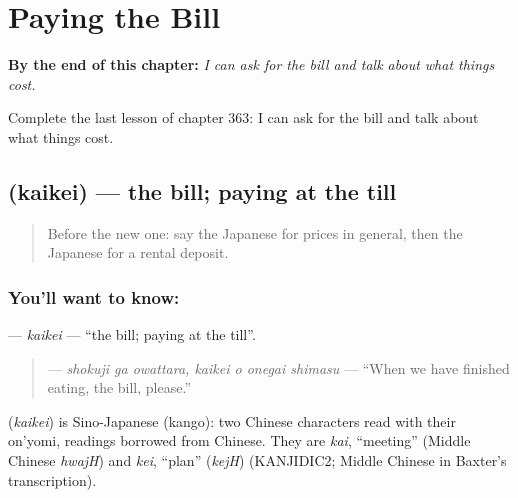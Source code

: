 
\chapter{Paying the Bill}
\label{ch:ja-paying-the-bill}

\begin{chapteropening}
\textbf{By the end of this chapter:} \emph{I can ask for the bill and talk about what things cost.}

Complete the last lesson of chapter 363: I can ask for the bill and talk about what things cost.
\end{chapteropening}

\section[\texorpdfstring{\ja{かいけい} (kaikei)}{かいけい (kaikei)}]{ (kaikei) — the bill; paying at the till}

\label{lesson:JA-C363-kaikei}



\begin{quote}
Before the new one: say the Japanese for prices in general, then the Japanese for a rental deposit.
\end{quote}

\subsection*{You'll want to know: }
\textbf{} — \emph{kaikei} — \textquotedblleft{}the bill; paying at the till\textquotedblright{}.

\begin{quote}
\textbf{  } — \emph{shokuji ga owattara, kaikei o onegai shimasu} — \textquotedblleft{}When we have finished eating, the bill, please.\textquotedblright{}
\end{quote}

\begin{cousinweb}
\textbf{} (\emph{kaikei}) is Sino-Japanese (kango): two Chinese characters read with their on'yomi, readings borrowed from Chinese. They are \emph{kai}, \textquotedblleft{}meeting\textquotedblright{} (Middle Chinese \emph{hwajH}) and \emph{kei}, \textquotedblleft{}plan\textquotedblright{} (\emph{kejH}) (KANJIDIC2; Middle Chinese in Baxter's transcription).
\end{cousinweb}

